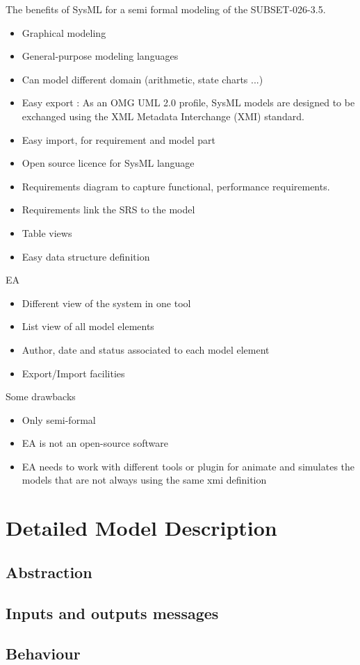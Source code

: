 \documentclass{template/openetcs_article}
\begin{document}
The benefits of SysML for a semi formal modeling of the SUBSET-026-3.5.
\begin{itemize}
\item Graphical modeling
\item General-purpose  modeling languages
\item Can model different domain (arithmetic, state charts ...)
\item Easy export : As an OMG UML 2.0 profile, SysML models are designed to be
exchanged using the XML Metadata Interchange (XMI) standard.
\item Easy import, for requirement and model part
\item Open source licence for SysML language
\item Requirements diagram to capture functional, performance requirements.
\item Requirements link the SRS to the model
\item Table views
\item Easy data structure definition
\end{itemize}
EA
\begin{itemize}
\item Different view of the system in one tool
\item List view of all model elements
\item Author, date and status associated to each model element
\item Export/Import facilities
\end{itemize}

Some drawbacks
\begin{itemize}
\item Only semi-formal
\item EA is not an  open-source software
\item EA needs to work with different tools or plugin for animate and simulates
the models that are not always using the same xmi definition
\end{itemize}


\section{Detailed Model Description}
\label{sec:deta-model-descr}
  \subsection{Abstraction}
  

  \subsection{Inputs and outputs messages}
  

  \subsection{Behaviour}
  \label{subsec:behavior}
  





\end{document}
